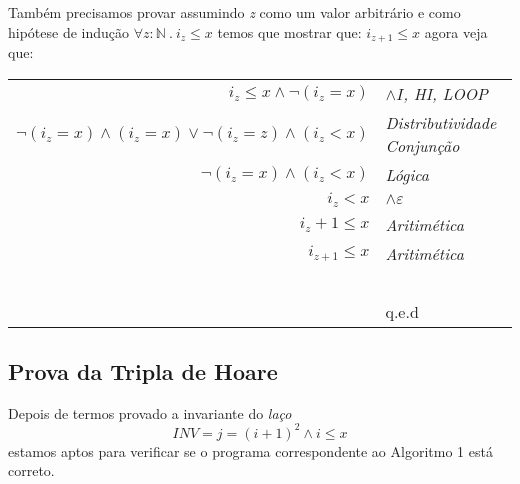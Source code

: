  Também precisamos provar assumindo \emph{z} como um valor arbitrário e como
 hipótese de indução $\forall z : \mathbb{N}\ .\ i_z \leq x$ temos que mostrar
 que: $i_{z+1} \leq x$ agora veja que:
 \begin{center}
     \begin{tabular}{rl}
         \emph{$i_z \leq x \land \neg(i_z = x) $}& \emph{$\land I$, HI, LOOP} \\
         \emph{$\neg(i_z=x) \land (i_z =x) \vee \neg(i_z=z) \land (i_z < x)$}&\emph{Distributividade Conjunção} \\
         \emph{$\neg(i_z =x) \land (i_z < x)$}& \emph{Lógica} \\
         \emph{$i_z < x$}& \emph{$\land \varepsilon$} \\
         \emph{$i_z +1 \leq x$}& \emph{Aritimética} \\
         \emph{$i_{z+1} \leq x$}& \emph{Aritimética} \\
         ~&~\\
         ~&q.e.d\\
     \end{tabular}
 \end{center}
\subsection{Prova da Tripla de Hoare}
\label{sub:hoarepow}

Depois de termos provado a invariante do \emph{laço} \[INV = j = (i + 1)^2
\land i \leq x\] estamos aptos para verificar se o programa correspondente ao
Algoritmo 1 está correto.

